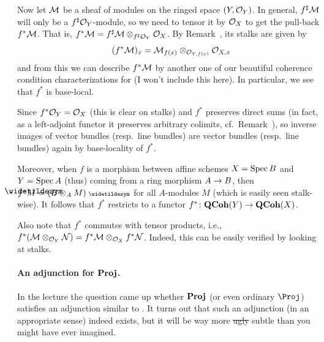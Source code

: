 \documentclass[a4paper,parskip=half,numbers=enddot, DIV=12]{scrreprt}
\begin{document}
\begin{rem}
\begin{alphanumerate}
		Now let $\mathcal{M}$ be a sheaf of modules on the ringed space $(Y,\mathcal{O}_Y)$. In general, $f^\sharp \mathcal{M}$ will only be a $f^\sharp\mathcal{O}_Y$-module, so we need to tensor it by $\mathcal{O}_X$ to get the pull-back $f^*\mathcal{M}$. That is, $f^*\mathcal{M}=f^\sharp\mathcal{M}\otimes_{f^\sharp\mathcal{O}_Y}\mathcal{O}_X$. By Remark~, its stalks are given by
		\begin{align*}
		(f^*\mathcal{M})_x=\mathcal{M}_{f(x)}\otimes_{\mathcal{O}_{Y,f(x)}}\mathcal{O}_{X,x}
		\end{align*}
		and from this we can describe $f^*\mathcal{M}$ by another one of our beautiful coherence condition characterizations for (I won't include this here). In particular, we see that $f^*$ is base-local.
		\item Since $f^*\mathcal{O}_Y=\mathcal{O}_X$ (this is clear on stalks) and $f^*$ preserves direct sums (in fact, as a left-adjoint functor it preserves arbitrary colimits, cf.\ Remark~), so inverse images of vector bundles (resp.\ line bundles) are vector bundles (resp.\ line bundles) again by base-locality of $f^*$.
		\item Moreover, when $f$ is a morphism between affine schemes $X=\operatorname{Spec} B$ and $Y=\operatorname{Spec} A$ (thus) coming from a ring morphism $A\morphism B$, then $f^*\snake{M}=(B\otimes_AM)^\qcmod$ for all $A$-modules $M$ (which is easily seen stalk-wise). It follows that $f^*$ restricts to a functor $f^*\colon \cat{QCoh}(Y)\morphism\cat{QCoh}(X)$.
		\item Also note that $f^*$ commutes with tensor products, i.e., $f^*(\mathcal{M}\otimes_{\mathcal{O}_Y}\mathcal{N})=f^*\mathcal{M}\otimes_{\mathcal{O}_X}f^*\mathcal{N}$. Indeed, this can be easily verified by looking at stalks.
	\end{alphanumerate}
\end{rem}
\paragraph{An adjunction for $\operatorname{\mathbf{Proj}}$.} In the lecture the question came up whether $\operatorname{\mathbf{Proj}}$ (or even ordinary $\Proj$) satisfies an adjunction similar to . It turns out that such an adjunction (in an appropriate sense) indeed exists, but it will be way more \sout{ugly} subtle than you might have ever imagined.
\end{document}
